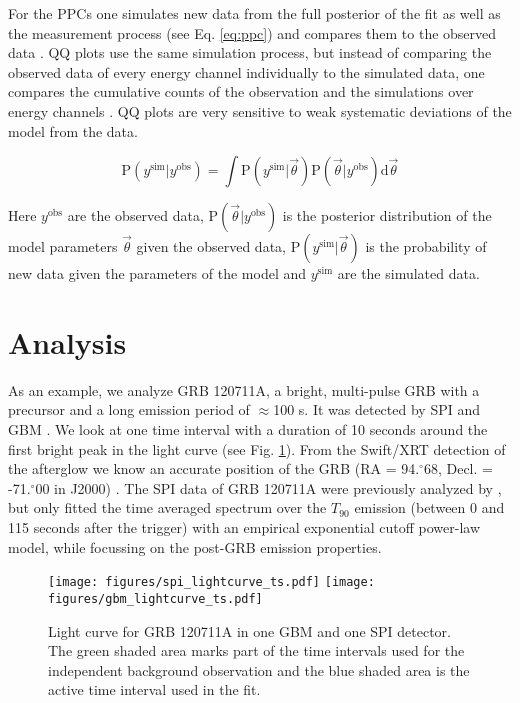 \documentclass[twocolumn,traditabstract]{aa}
\def\fdg{\hbox{$.\!\!^\circ$}}          %
\begin{document}
For the PPCs one simulates new data from the full posterior of the fit as well as the measurement process (see Eq. \ref{eq:ppc}) and compares them to the observed data \citep{ppc}. QQ plots use the same simulation process, but instead of comparing the observed data of every energy channel individually to the simulated data, one compares the cumulative counts of the observation and the simulations over energy channels  \citep{QQ}. QQ plots are very sensitive to weak systematic deviations of the model from the data.

\begin{equation}
  \textrm{P}(y^{\textrm{sim}}|y^{\textrm{obs}}) = \int \textrm{P}(y^{\textrm{sim}}|\vec{\theta}) \textrm{P}(\vec{\theta}|y^{\textrm{obs}}) \mathrm{d}\vec{\theta}
  \label{eq:ppc}
\end{equation}

\noindent
Here $y^{\textrm{obs}}$ are the observed data, $\textrm{P}(\vec{\theta}|y^{\textrm{obs}})$ is the posterior distribution of the model parameters $\vec{\theta}$ given the observed data, $\textrm{P}(y^{\textrm{sim}}|\vec{\theta})$ is the probability of new data given the parameters of the model and $y^{\textrm{sim}}$ are the simulated data.

\section{Analysis}
\label{analysis}
As an example, we analyze GRB 120711A, a bright, multi-pulse GRB with a precursor and a long emission period of $\approx$100 s. It was detected by SPI and GBM \citep{GCN_integral, GCN_gbm}.
We look at one time interval with a duration of 10 seconds around the first bright peak in the light curve (see Fig. \ref{fig:time_selection}). From the Swift/XRT detection of the afterglow we know an accurate position of the GRB (RA = 94\fdg68, Decl. = -71\fdg00 in J2000) \citep{GCN_swift}. The SPI data of GRB 120711A were previously analyzed by \citet{Martin-Carrillo-2014}, but only fitted the time averaged spectrum over the $T_{90}$ emission (between 0 and 115 seconds after the trigger) with an empirical exponential cutoff power-law model, while focussing on the post-GRB emission properties.

\begin{figure}
  \begin{centering}
    \texttt{[image: figures/spi\_lightcurve\_ts.pdf]}
    \texttt{[image: figures/gbm\_lightcurve\_ts.pdf]}
    \caption{Light curve for GRB 120711A in one GBM and one SPI detector. The green shaded area marks part of the time intervals used for the independent background observation and the blue shaded area is the active time interval used in the fit.}
    \label{fig:time_selection}
  \end{centering}
\end{figure}
\end{document}
